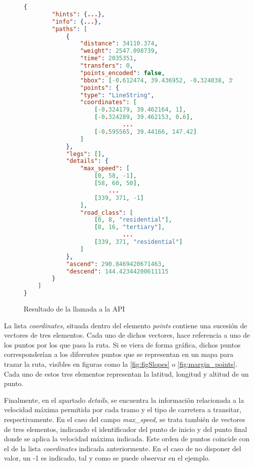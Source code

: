 \documentclass[11pt,spanish,listoffigures,listoftables]{tfgetsinf}
\begin{document}
\begin{figure}[!htb]
    \begin{lstlisting}[language=json,numbers=none]
    {
        "hints": {...},
        "info": {...},
        "paths": [
            {
                "distance": 34110.374,
                "weight": 2547.098739,
                "time": 2035351,
                "transfers": 0,
                "points_encoded": false,
                "bbox": [-0.612474, 39.436952, -0.324038, 39.481743],
                "points": {
                "type": "LineString",
                "coordinates": [
                    [-0.324179, 39.462164, 1],
                    [-0.324289, 39.462153, 0.6],
                            ...
                    [-0.595565, 39.44166, 147.42]
                ]
            },
            "legs": [],
            "details": {
                "max_speed": [
                    [0, 58, -1],
                    [58, 60, 50],
                        ...
                    [339, 371, -1]
                ],
                "road_class": [
                    [0, 8, "residential"],
                    [8, 16, "tertiary"],
                            ...
                    [339, 371, "residential"]
                ]
            },
            "ascend": 290.8469420671463,
            "descend": 144.42344200611115
        }
    ]
}
    \end{lstlisting}
    \caption{Resultado de la llamada a la API}
    \label{fig:graphhopper_json}
\end{figure}

La lista \textit{coordinates}, situada dentro del elemento \textit{points} contiene una sucesión de vectores de tres elementos. Cada uno de dichos vectores, hace referencia a uno de los puntos por los que pasa la ruta. Si se viera de forma gráfica, dichos puntos corresponderían a los diferentes puntos que se representan en un mapa para trazar la ruta, visibles en figuras como la \ref{fig:figSlopes} o \ref{fig:margin_points}. Cada uno de estos tres elementos representan la latitud, longitud y altitud de un punto.

Finalmente, en el apartado \textit{details}, se encuentra la información relacionada a la velocidad máxima permitida por cada tramo y el tipo de carretera a transitar, respectivamente. En el caso del campo \textit{max\_speed}, se trata también de vectores de tres elementos, indicando el identificador del punto de inicio y del punto final donde se aplica la velocidad máxima indicada. Este orden de puntos coincide con el de la lista \textit{coordinates} indicada anteriormente. En el caso de no disponer del valor, un -1 es indicado, tal y como se puede observar en el ejemplo.
\end{document}
